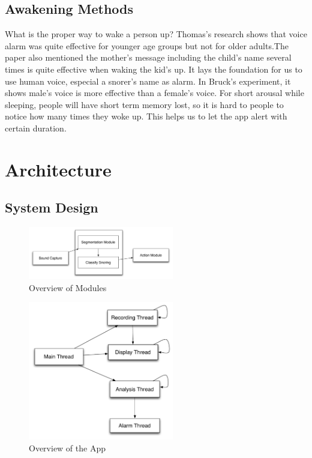 \documentclass[conference]{IEEEtran}
\begin{document}
\subsection{Awakening Methods} %
\label{sub:awakening_methods}

What is the proper way to wake a person up? Thomas's research shows that voice alarm was quite effective for younger age groups but not for older adults\cite{thomas2010awakening}.The paper\cite{thomas2010awakening} also mentioned the mother's message including the child's name several times is quite effective when waking the kid's up. It lays the foundation for us to use human voice, especial a snorer's name as alarm. In Bruck's experiment, it shows male's voice is more effective than a female's voice\cite{bruck2008comparison}. For short arousal while sleeping, people will have short term memory lost, so it is hard to people to notice how many times they woke up\cite{bonnet1983memory}. This helps us to let the app alert with certain duration.







\section{Architecture} %
\label{sec:architecture}
\subsection{System Design} %
\label{sub:overview_design}

\begin{figure}[!t]
\centering
\includegraphics[width=2.5in]{modules.pdf}
\caption{Overview of Modules}
\label{fig:app_modules}
\end{figure}

\begin{figure}[!t]
\centering
\includegraphics[width=2.5in]{system.pdf}
\caption{Overview of the App}
\label{fig:app_overview}
\end{figure}
\end{document}
